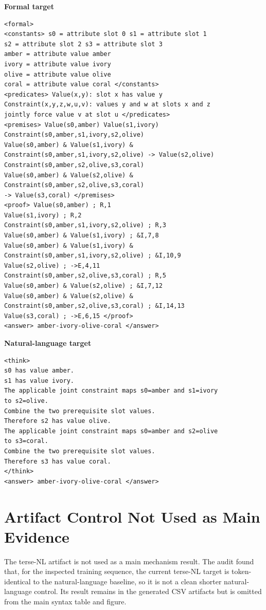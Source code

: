 \documentclass[11pt]{article}
\begin{document}
\noindent\begin{minipage}[t]{0.48\linewidth}
\textbf{Formal target}
\scriptsize
\begin{verbatim}
<formal>
<constants> s0 = attribute slot 0 s1 = attribute slot 1
s2 = attribute slot 2 s3 = attribute slot 3
amber = attribute value amber
ivory = attribute value ivory
olive = attribute value olive
coral = attribute value coral </constants>
<predicates> Value(x,y): slot x has value y
Constraint(x,y,z,w,u,v): values y and w at slots x and z
jointly force value v at slot u </predicates>
<premises> Value(s0,amber) Value(s1,ivory)
Constraint(s0,amber,s1,ivory,s2,olive)
Value(s0,amber) & Value(s1,ivory) &
Constraint(s0,amber,s1,ivory,s2,olive) -> Value(s2,olive)
Constraint(s0,amber,s2,olive,s3,coral)
Value(s0,amber) & Value(s2,olive) &
Constraint(s0,amber,s2,olive,s3,coral)
-> Value(s3,coral) </premises>
<proof> Value(s0,amber) ; R,1
Value(s1,ivory) ; R,2
Constraint(s0,amber,s1,ivory,s2,olive) ; R,3
Value(s0,amber) & Value(s1,ivory) ; &I,7,8
Value(s0,amber) & Value(s1,ivory) &
Constraint(s0,amber,s1,ivory,s2,olive) ; &I,10,9
Value(s2,olive) ; ->E,4,11
Constraint(s0,amber,s2,olive,s3,coral) ; R,5
Value(s0,amber) & Value(s2,olive) ; &I,7,12
Value(s0,amber) & Value(s2,olive) &
Constraint(s0,amber,s2,olive,s3,coral) ; &I,14,13
Value(s3,coral) ; ->E,6,15 </proof>
<answer> amber-ivory-olive-coral </answer>
\end{verbatim}
\end{minipage}\hfill
\begin{minipage}[t]{0.48\linewidth}
\textbf{Natural-language target}
\scriptsize
\begin{verbatim}
<think>
s0 has value amber.
s1 has value ivory.
The applicable joint constraint maps s0=amber and s1=ivory
to s2=olive.
Combine the two prerequisite slot values.
Therefore s2 has value olive.
The applicable joint constraint maps s0=amber and s2=olive
to s3=coral.
Combine the two prerequisite slot values.
Therefore s3 has value coral.
</think>
<answer> amber-ivory-olive-coral </answer>
\end{verbatim}
\end{minipage}

\section{Artifact Control Not Used as Main Evidence}
\label{sec:excluded-controls}

The terse-NL artifact is not used as a main mechanism result. The audit found
that, for the inspected training sequence, the current terse-NL target is
token-identical to the natural-language baseline, so it is not a clean shorter
natural-language control. Its result remains in the generated CSV artifacts but
is omitted from the main syntax table and figure.
\end{document}
